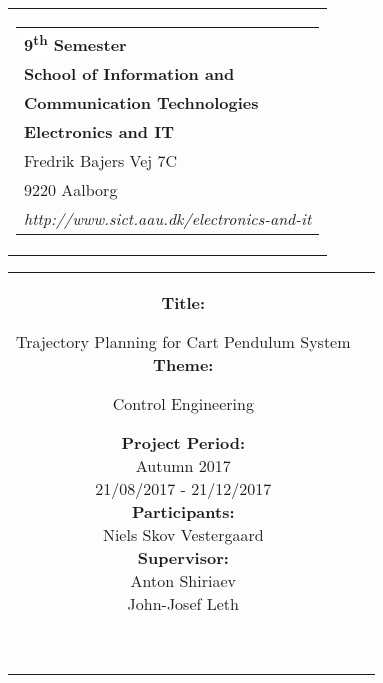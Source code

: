 % 
\thispagestyle{empty}
\begin{titlepage}
\begin{nopagebreak}
{\samepage 

\begin{tabular}{r}
\hspace{-.6cm} \parbox{\textwidth}{  
\hspace{1.25cm} \parbox{8cm}{\begin{tabular}{l} %
{\small \textbf{\textcolor{aaublue}{\colorbox{white}{9\textsuperscript{th} Semester}}}}\\
{\small \textbf{\textcolor{aaublue}{School of Information and}}}\\
{\small \textbf{\textcolor{aaublue}{Communication Technologies}}}\\ 
{\small \textbf{\textcolor{aaublue}{Electronics and IT}}}\\
{\small \textcolor{aaublue}{Fredrik Bajers Vej 7C}} \\
{\small \textcolor{aaublue}{9220 Aalborg}} \\
{\small \textcolor{aaublue}{\emph{http://www.sict.aau.dk/electronics-and-it}}}
\end{tabular}}}
\end{tabular}

\begin{tabular}{cc}
\parbox{7cm}{

\textbf{Title:}

Trajectory Planning for Cart Pendulum System\\

\textbf{Theme:}

\small{
Control Engineering\\
}


\parbox{8cm}{


\textbf{Project Period:}\\
Autumn 2017\\
21/08/2017 - 21/12/2017\\

\textbf{Participants:}\\
Niels Skov Vestergaard\\

\textbf{Supervisor:}\\
Anton Shiriaev\\
John-Josef Leth\\
}\\

}
\end{tabular}}
\end{nopagebreak}
\end{titlepage}
